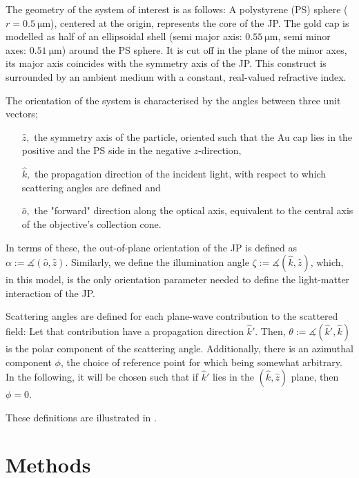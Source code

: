 \documentclass[10pt]{article}
\begin{document}
\begin{multicols}{2}
The geometry of the system of interest is as follows: 
A polystyrene (PS) sphere ($r=\SI{0.5}{\micro\meter}$), centered at the origin, represents the core of the JP. 
The gold cap is modelled as half of an ellipsoidal shell (semi major axis: $\SI{0.55}{\micro\meter}$, semi minor axes: $\SI{0.51}{\micro\meter}$) around the PS sphere. 
It is cut off in the plane of the minor axes, its major axis coincides with the symmetry axis of the JP. 
This construct is surrounded by an ambient medium with a constant, real-valued refractive index.  

The orientation of the system is characterised by the angles between three unit vectors;
\begin{itemize}
    \item[$\hat{z},$] the symmetry axis of the particle, oriented such that the Au cap lies in the positive and the PS side in the negative $z$-direction, 
    \item[$\hat{k},$] the propagation direction of the incident light, with respect to which scattering angles are defined and
    \item[$\hat{o},$] the "forward" direction along the optical axis, equivalent to the central axis of the objective's collection cone. 
\end{itemize}
In terms of these, the out-of-plane orientation of the JP is defined as
$\alpha := \measuredangle( \hat{o}, \hat{z} )$.
Similarly, we define the illumination angle 
$\zeta := \measuredangle( \hat{k}, \hat{z} )$, 
which, in this model, is the only orientation parameter needed to define the light-matter interaction of the JP. 

Scattering angles are defined for each plane-wave contribution to the scattered field: 
Let that contribution have a propagation direction $\hat{k}'$. 
Then, \mbox{$\theta := \measuredangle( \hat{k}', \hat{k} )$} is the polar component of the scattering angle. 
Additionally, there is an azimuthal component $\phi$, the choice of reference point for which being somewhat arbitrary. 
In the following, it will be chosen such that if $\hat{k}'$ lies in the $(\hat{k},\hat{z})$ plane, then $\phi=0$.

These definitions are illustrated in . 



\section*{Methods}






\end{multicols}
\end{document}
